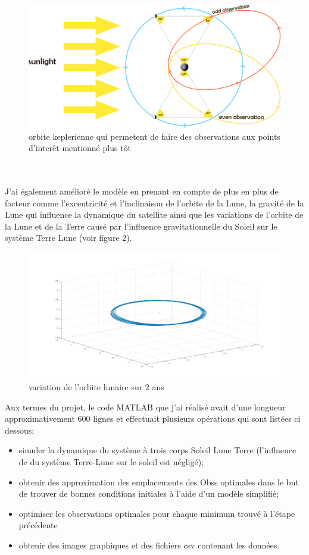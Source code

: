 \documentclass[12pt]{article} %
\begin{document}
		
		\begin{figure}[h]
			\includegraphics[width=18cm]{images/observations_main.png}
			\caption{orbite keplerienne qui permetent de faire des observations aux points d'interêt mentionné plus tôt}
		\end{figure}
		\\ \\
		J'ai également amélioré le modèle en prenant en compte de plus en plus de facteur comme l'excentricité et l'inclinaison de l'orbite de la Lune, la gravité de la Lune qui influence la dynamique du satellite ainsi que les variations de l'orbite de la Lune et de la Terre causé par l'influence gravitationnelle du Soleil sur le système Terre Lune (voir figure 2).
		\begin{figure}[h]
			\includegraphics[width=18cm]{images/moon_orbit.jpg}
			\caption{variation de l'orbite lunaire sur 2 ans}
		\end{figure}
		
		Aux termes du projet, le code MATLAB que j'ai réalisé avait d'une longueur approximativement 600 lignes et effectuait plusieurs opérations qui sont listées ci dessous: 
		
		\begin{itemize}
			\item simuler la dynamique du système à trois corps Soleil Lune Terre (l'influence de du système Terre-Lune sur le soleil est négligé);
			\item obtenir des approximation des emplacements des \glspl{Obs} optimales dans le but de trouver de bonnes conditions initiales à l'aide d'un modèle simplifié;
			\item optimiser les observations optimales pour chaque minimum trouvé à l'étape précédente
			\item obtenir des images graphiques et des fichiers csv contenant les données.
		\end{itemize}
		
\end{document}

